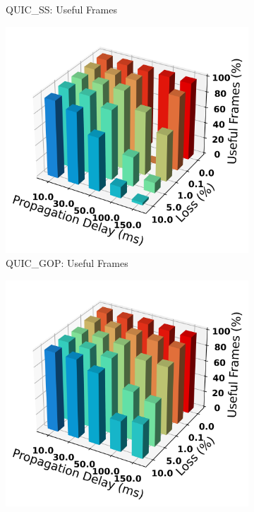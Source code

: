 \documentclass{mpaper}
\begin{document}
\begin{figure}
\begin{subfigure}[b]{0.25\textwidth}
      \caption{QUIC\_SS: Useful Frames}
      \label{fig:SS_bar-168}
  \end{subfigure}
  \hfill
  \begin{subfigure}[b]{0.25\textwidth}
      \centering
      \includegraphics[width=\textwidth]{Frame_Usefulness_Ratio/QUIC_GOP/AVG_Frame_Usefulness-168.png}
      \caption{QUIC\_GOP: Useful Frames}
      \label{fig:GOP_bar-168}
  \end{subfigure}
  \begin{subfigure}[b]{0.25\textwidth}
      \centering
      \includegraphics[width=\textwidth]{Frame_Usefulness_Ratio/QUIC_FPS/AVG_Frame_Usefulness-168.png}

\end{subfigure}
\end{figure}
\end{document}
